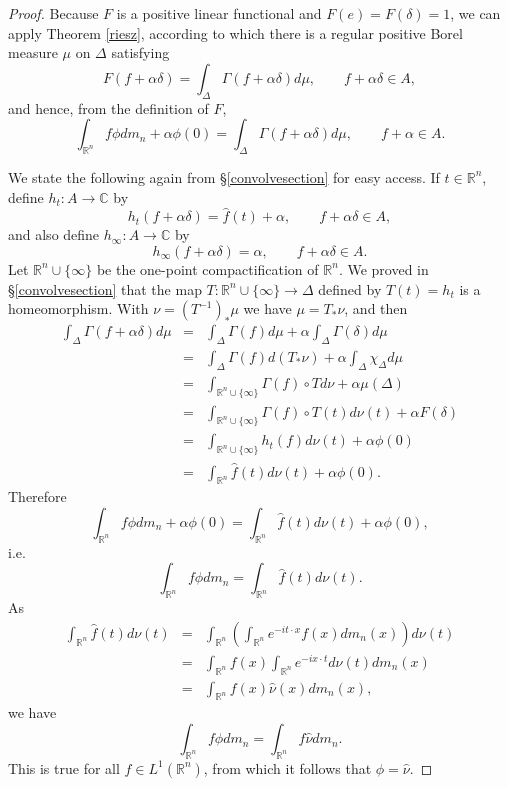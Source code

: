 \documentclass{article}
\theoremstyle{definition}
\theoremstyle{definition}
\begin{document}
\begin{proof}
Because $F$ is a positive linear functional and $F(e)=F(\delta)=1$, we can apply Theorem \ref{riesz}, according to which there is a regular
positive Borel measure $\mu$ on $\Delta$ satisfying
\[
F(f+\alpha \delta) = \int_\Delta \Gamma(f+\alpha \delta) d\mu, \qquad f+\alpha \delta \in A,
\]
and hence, from the definition of $F$,
\[
\int_{\mathbb{R}^n} f\phi dm_n + \alpha \phi(0) = \int_\Delta \Gamma(f+\alpha \delta) d\mu,\qquad f+\alpha \in A.
\]

We state the following again from \S \ref{convolvesection} for easy access. 
If $t \in \mathbb{R}^n$, define $h_t:A \to \mathbb{C}$ by 
\[
h_t(f+\alpha \delta) = \hat{f}(t)+\alpha, \qquad f+\alpha \delta \in A,
\]
and also define $h_\infty:A \to \mathbb{C}$ by
\[
h_\infty(f+\alpha \delta)=\alpha, \qquad f+\alpha \delta \in A.
\]
Let $\mathbb{R}^n \cup \{\infty\}$ be the one-point compactification of $\mathbb{R}^n$. We proved in \S \ref{convolvesection} that the map
$T:\mathbb{R}^n \cup \{\infty\} \to \Delta$  defined by $T(t)=h_t$ is a homeomorphism. With $\nu=(T^{-1})_* \mu$ we have $\mu=T_* \nu$,
and then
\begin{eqnarray*}
\int_\Delta \Gamma(f+\alpha \delta) d\mu&=&\int_\Delta \Gamma(f) d\mu + \alpha \int_\Delta \Gamma(\delta) d\mu\\
&=&\int_\Delta \Gamma(f) d(T_*\nu)+\alpha \int_{\Delta} \chi_\Delta d\mu\\
&=&\int_{\mathbb{R}^n \cup \{\infty\}} \Gamma(f) \circ T d\nu + \alpha \mu(\Delta)\\
&=&\int_{\mathbb{R}^n \cup \{\infty\}} \Gamma(f) \circ T(t) d\nu(t) + \alpha F(\delta)\\
&=&\int_{\mathbb{R}^n \cup \{\infty\}} h_t(f) d\nu(t)+\alpha \phi(0)\\
&=&\int_{\mathbb{R}^n} \hat{f}(t) d\nu(t) +\alpha\phi(0).
\end{eqnarray*}
Therefore
\[
\int_{\mathbb{R}^n} f\phi dm_n + \alpha \phi(0)  = \int_{\mathbb{R}^n} \hat{f}(t) d\nu(t) +\alpha\phi(0),
\]
i.e.
\[
\int_{\mathbb{R}^n} f\phi dm_n = \int_{\mathbb{R}^n} \hat{f}(t) d\nu(t).
\]
As
\begin{eqnarray*}
\int_{\mathbb{R}^n} \hat{f}(t) d\nu(t) &=& \int_{\mathbb{R}^n}\left( \int_{\mathbb{R}^n}  e^{-it\cdot x} f(x) dm_n(x)\right) d\nu(t)\\
&=&\int_{\mathbb{R}^n} f(x) \int_{\mathbb{R}^n} e^{-ix\cdot t} d\nu(t) dm_n(x)\\
&=&\int_{\mathbb{R}^n} f(x) \hat{\nu}(x) dm_n(x),
\end{eqnarray*}
we have
\[
\int_{\mathbb{R}^n} f\phi dm_n = \int_{\mathbb{R}^n} f \hat{\nu} dm_n.
\]
This is true for all $f\in L^1(\mathbb{R}^n)$, from which it follows that $\phi=\hat{\nu}$.
\end{proof}
\end{document}

